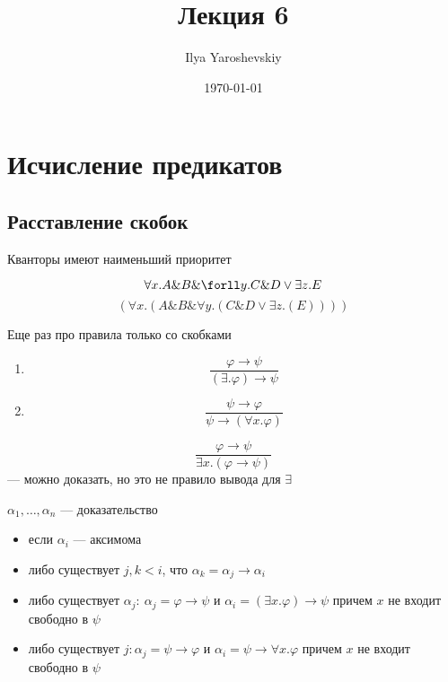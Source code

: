 \documentclass[english]{article}
\author{Ilya Yaroshevskiy}
\date{\today}
\title{Лекция 6}
\begin{document}
\maketitle
\tableofcontents


\section{Исчисление предикатов}
\label{sec:orgb0f2e37}
\subsection{Расставление скобок}
\label{sec:org4939c0b}
Кванторы имеют наименьший приоритет
\begin{examp}
	\[ \forall x. A \& B \& \forll y. C \& D \vee \exists z. E \]
	\[ (\forall x. (A \& B \& \forall y. (C \& D \vee \exists z. (E)))) \]
\end{examp}
Еще раз про правила только со скобками
\begin{enumerate}
	\item \[ \frac{\varphi \to \psi}{(\exists. \varphi) \to \psi} \]
	\item \[ \frac{\psi \to \varphi}{\psi \to (\forall x. \varphi)} \]
\end{enumerate}
\begin{examp}
	\[ \frac{\varphi \to \psi}{\exists x.(\varphi \to \psi)} \]
	--- можно доказать, но это не правило вывода для \(\exists\)
\end{examp}
\begin{definition}
	\-
	\(\alpha_1, \dots, \alpha_n\) --- доказательство
	\begin{itemize}
		\item если \(\alpha_i\) --- аксимома
		\item либо существует \(j, k < i\), что \(\alpha_k = \alpha_j \to \alpha_i\)
		\item либо существует \(\alpha_j:\ \alpha_j = \varphi \to \psi\) и \(\alpha_i = (\exists x. \varphi) \to \psi\) причем \(x\) не входит свободно в \(\psi\)
		\item либо существует \(j: \alpha_j = \psi \to \varphi\) и \(\alpha_i = \psi \to \forall x. \varphi\) причем \(x\) не входит свободно в \(\psi\)
	\end{itemize}
\end{definition}
\end{document}
